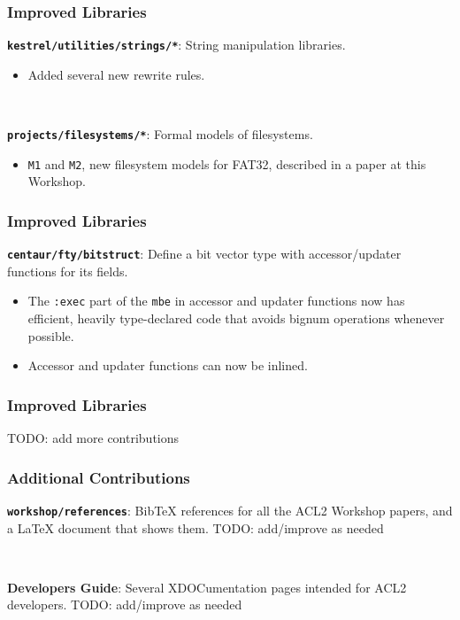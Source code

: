 \documentclass{beamer}
\newcommand{\code}[1]{\texttt{#1}}
\newcommand{\bookpath}[1]{\textbf{\code{#1}}}
\newcommand{\implibtitle}{\frametitle{Improved Libraries}}
\begin{document}

\begin{frame}

\implibtitle

\bookpath{kestrel/utilities/strings/*}:
String manipulation libraries.
\begin{itemize}
\item Added several new rewrite rules.
\end{itemize}

\

\bookpath{projects/filesystems/*}:
Formal models of filesystems.
\begin{itemize}
\item
\texttt{M1} and \texttt{M2}, new filesystem models for FAT32,
described in a paper at this Workshop.
\end{itemize}

\end{frame}


\begin{frame}

\implibtitle

\bookpath{centaur/fty/bitstruct}:
Define a bit vector type with accessor/updater functions for its fields.
\begin{itemize}
\item 
The \code{:exec} part of the \code{mbe} in accessor and updater
functions now has efficient, heavily type-declared code that avoids
bignum operations whenever possible.
\item 
Accessor and updater functions can now be inlined.
\end{itemize}

\end{frame}


\begin{frame}

\implibtitle

TODO: add more contributions

\end{frame}


\begin{frame}

\frametitle{Additional Contributions}

\bookpath{workshop/references}:
BibTeX references for all the ACL2 Workshop papers,
and a LaTeX document that shows them.
TODO: add/improve as needed

\

\textbf{Developers Guide}:
Several XDOCumentation pages intended for ACL2 developers.
TODO: add/improve as needed

\end{frame}

\end{document}
